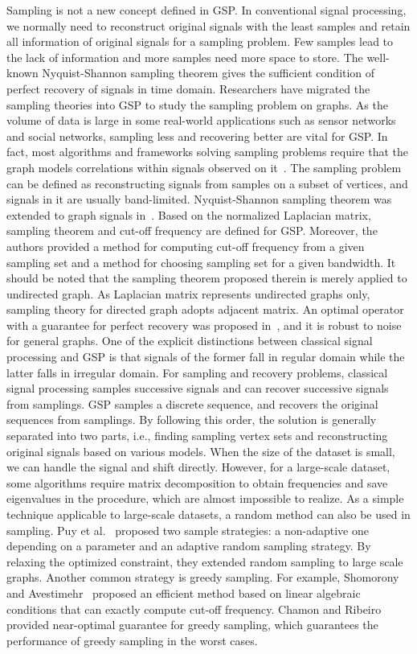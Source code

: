 Sampling is not a new concept defined in GSP. In conventional signal processing, we normally need to reconstruct original signals with the least samples and retain all information of original signals for a sampling problem. Few samples lead to the lack of information and more samples need more space to store. The well-known Nyquist-Shannon sampling theorem gives the sufficient condition of perfect recovery of signals in time domain.
Researchers have migrated the sampling theories into GSP to study the sampling problem on graphs. As the volume of data is large in some real-world applications such as sensor networks and social networks, sampling less and recovering better are vital for GSP. In fact, most algorithms and frameworks solving sampling problems require that the graph models correlations within signals observed on it~. The sampling problem can be defined as reconstructing signals from samples on a subset of vertices, and signals in it are usually band-limited. Nyquist-Shannon sampling theorem was extended to graph signals in~. Based on the normalized Laplacian matrix, sampling theorem and cut-off frequency are defined for GSP. Moreover, the authors provided a method for computing cut-off frequency from a given sampling set and a method for choosing sampling set for a given bandwidth. It should be noted that the sampling theorem proposed therein is merely applied to undirected graph. As Laplacian matrix represents undirected graphs only, sampling theory for directed graph adopts adjacent matrix. An optimal operator with a guarantee for perfect recovery was proposed in~, and it is robust to noise for general graphs.
One of the explicit distinctions between classical signal processing and GSP is that signals of the former fall in regular domain while the latter falls in irregular domain. For sampling and recovery problems, classical signal processing samples successive signals and can recover successive signals from samplings. GSP samples a discrete sequence, and recovers the original sequences from samplings. By following this order, the solution is generally separated into two parts, i.e., finding sampling vertex sets and reconstructing original signals based on various models.
When the size of the dataset is small, we can handle the signal and shift directly. However, for a large-scale dataset, some algorithms require matrix decomposition to obtain frequencies and save eigenvalues in the procedure, which are almost impossible to realize. As a simple technique applicable to large-scale datasets, a random method can also be used in sampling. Puy et al.~ proposed two sample strategies: a non-adaptive one depending on a parameter and an adaptive random sampling strategy. By relaxing the optimized constraint, they extended random sampling to large scale graphs. Another common strategy is greedy sampling. For example, Shomorony and Avestimehr~ proposed an efficient method based on linear algebraic conditions that can exactly compute cut-off frequency. Chamon and Ribeiro~ provided near-optimal guarantee for greedy sampling, which guarantees the performance of greedy sampling in the worst cases.
